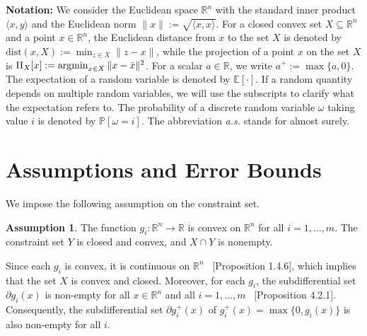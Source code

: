 \documentclass{article}
\def\R{\mathbb{R}}
\def\argmin{\mathop{\rm argmin}}
\theoremstyle{plain}
\theoremstyle{definition}
\newtheorem{assumption}[theorem]{Assumption}
\theoremstyle{remark}
\begin{document}
\noindent \textbf{Notation:} 
We consider the Euclidean space \(\mathbb{R}^n\) with the standard inner product \(\langle x, y \rangle\) and the Euclidean norm \(\|x\| := \sqrt{\langle x, x \rangle}\). For a closed convex set \(X \subseteq \mathbb{R}^n\) and a point $x \in \mathbb{R}^n$, the Euclidean distance from  $x$ to the set $X$ is denoted by \(\mathrm{dist}(x, X) := \min_{z \in X} \|z - x\|\), while the projection of a point $x$ on the set $X$ is \(\Pi_X[x] := \argmin_{x \in X} \|x - \bar{x}\|^2\). For a scalar \(a \in \mathbb{R}\), we write \(a^+ := \max\{a, 0\}\). The expectation of a random variable is denoted by $\mathbb{E}[\cdot]$. If a random quantity depends on multiple random variables,
we will use the subscripts to clarify what the expectation refers to. The probability of a discrete random variable $\omega$ taking value $i$ is denoted by $\mathbb{P}[\omega=i]$. The abbreviation \textit{a.s.} stands for almost surely.



\section{Assumptions and Error Bounds}\label{sec:problem}
We impose the following assumption on the constraint set.
%
%
\begin{assumption}\label{asum_set1}
The function $g_i: \R^n \rightarrow \R$ is convex on $\R^n$ for all $i=1,\ldots,m$. The constraint set $Y$ is closed and convex, and $X\cap Y$ is nonempty. 
\end{assumption}
%
%
Since each $g_i$ is convex, it is continuous on $\R^n$~\cite{bertsekas2003convex} [Proposition 1.4.6], which implies that the set $X$ is convex and closed. Moreover, for each $g_i$, the subdifferential set $\partial g_i(x)$ is non-empty for all $x \in \R^n$ and all $i =1,\ldots,m$~\cite{bertsekas2003convex} [Proposition 4.2.1]. Consequently, the subdifferential set $\partial g_i^{+}(x)$ of $g_i^{+}(x) = \max\{0,g_{i}(x)\}$ is also non-empty for all $i$.
\end{document}
